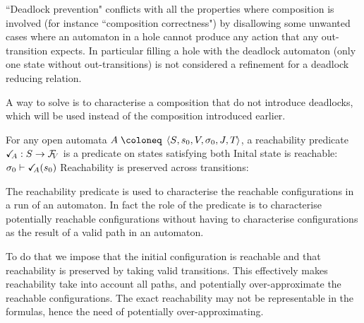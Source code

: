 \documentclass{article}
\begin{document}
``Deadlock prevention" conflicts with all the properties where composition is involved (for instance ``composition correctness") by disallowing some unwanted cases where an automaton in a hole cannot produce any action that any out-transition expects.
In particular filling a hole with the deadlock automaton (only one state without out-transitions) is not considered a refinement for a deadlock reducing relation.


A way to solve  is to characterise a composition that do not introduce deadlocks, which will be used instead of the composition introduced earlier.
\begin{defi}[Reachability]
For any open automata \(A \defobject \OAg\), a reachability predicate \(\reach{A}: S \to \rformulas[V]\) is a predicate on states satisfying both
 Inital state is reachable: \(\sigma_0 \vdash \reach{A}\mpar{s_0}\)
 Reachability is preserved across transitions: 
\end{defi}
The reachability predicate is used to characterise the reachable configurations in a run of an automaton.
In fact the role of the predicate is to characterise potentially reachable configurations without having to characterise configurations as the result of a valid path in an automaton.

To do that we impose that the initial configuration is reachable and that reachability is preserved by taking valid transitions.
This effectively makes reachability take into account all paths, and potentially over-approximate the reachable configurations.
The exact reachability may not be representable in the formulas, hence the need of potentially over-approximating.
\end{document}
